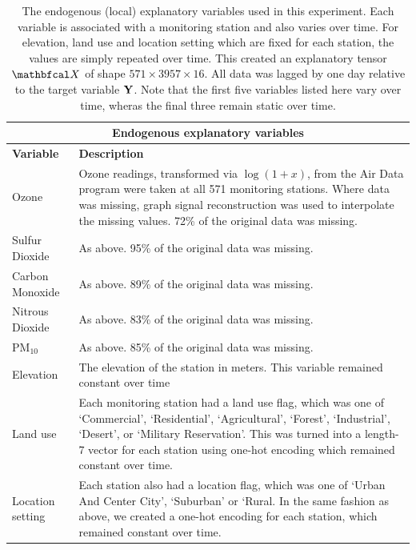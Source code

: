 
\begin{table}[p]
    \renewcommand{\arraystretch}{2}
    \centering
    \begin{tabular}{l p{10.5cm}}
    \toprule
    \multicolumn{2}{c}{\textbf{Endogenous explanatory variables}} \\
    \midrule
    \textbf{Variable} & \textbf{Description} \\
    \midrule
    Ozone & Ozone readings, transformed via $\log(1+x)$, from the Air Data program were taken at all 571 monitoring stations. Where data was missing, graph signal reconstruction was used to interpolate the missing values. 72\% of the original data was missing. \\
    Sulfur Dioxide & As above. 95\% of the original data was missing.  \\
    Carbon Monoxide & As above. 89\% of the original data was missing.  \\
    Nitrous Dioxide & As above. 83\% of the original data was missing.  \\
    PM$_{10}$  & As above. 85\% of the original data was missing.  \\
    Elevation & The elevation of the station in meters. This variable remained constant over time \\
    Land use & Each monitoring station had a land use flag, which was one of `Commercial', `Residential', `Agricultural', `Forest', `Industrial', `Desert', or `Military Reservation'. This was turned into a length-7 vector for each station using one-hot encoding which remained constant over time. \\
    Location setting & Each station also had a location flag, which was one of `Urban And Center City', `Suburban' or `Rural. In the same fashion as above, we created a one-hot encoding for each station, which remained constant over time. \\
    \bottomrule
    \end{tabular}
    \vspace*{0.3cm}
    \caption[Local explanatory variables used in environmental modelling application]{The endogenous (local) explanatory variables used in this experiment. Each variable is associated with a monitoring station and also varies over time. For elevation, land use and location setting which are fixed for each station, the values are simply repeated over time. This created an explanatory tensor $\Xt$ of shape $571 \times 3957 \times 16$. All data was lagged by one day relative to the target variable $\mathbf{Y}$. Note that the first five variables listed here vary over time, wheras the final three remain static over time. }
    \label{tab:features2}
\end{table}

